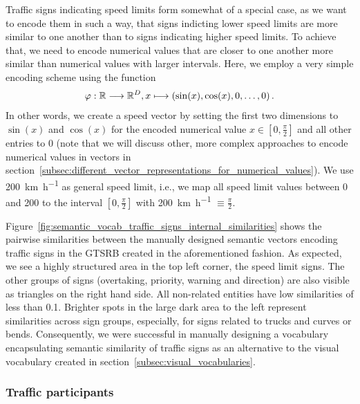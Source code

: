 Traffic signs indicating speed limits form somewhat of a special case, as we want to encode them in such a way, that signs indicting lower speed limits are more similar to one another than to signs indicating higher speed limits.
To achieve that, we need to encode numerical values that are closer to one another more similar than numerical values with larger intervals.
Here, we employ a very simple encoding scheme using the function 
\begin{equation}
\label{eq:cosin_vec_func}
\varphi: \mathbb{R} \longrightarrow \mathbb{R}^{D}, x \longmapsto \left(\sin(x), \cos(x), 0, \ldots, 0\right).
\end{equation}
In other words, we create a speed vector by setting the first two dimensions to $\sin(x)$ and $\cos(x)$ for the encoded numerical value $x \in [0,\frac{\pi}{2}]$ and all other entries to \num{0} (note that we will discuss other, more complex approaches to encode numerical values in vectors in section~\ref{subsec:different_vector_representations_for_numerical_values}).
We use \SI[per-mode=symbol]{200}{\kilo\meter\per\hour} as general speed limit, i.e., we map all speed limit values between \num{0} and \num{200} to the interval $\left[0, \frac{\pi}{2}\right]$ with \SI[per-mode=symbol]{200}{\kilo\meter\per\hour} $\equiv \frac{\pi}{2}$.

Figure~\ref{fig:semantic_vocab_traffic_signs_internal_similarities} shows the pairwise similarities between the manually designed semantic vectors encoding traffic signs in the \ac{GTSRB} created in the aforementioned fashion.
As expected, we see a highly structured area in the top left corner, the speed limit signs.
The other groups of signs (overtaking, priority, warning and direction) are also visible as triangles on the right hand side.
All non-related entities have low similarities of less than \num{0.1}.
Brighter spots in the large dark area to the left represent similarities across sign groups, especially, for signs related to trucks and curves or bends.
Consequently, we were successful in manually designing a vocabulary encapsulating semantic similarity of traffic signs as an alternative to the visual vocabulary created in section~\ref{subsec:visual_vocabularies}.

\subsubsection{Traffic participants}%
\label{ssubsec:traffic_participants}

